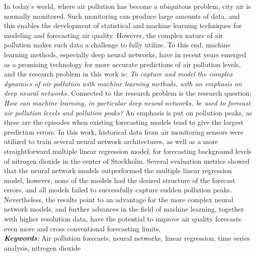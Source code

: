 In today's world, where air pollution has become a ubiquitous problem, city air is normally monitored. Such monitoring can produce large amounts of data, and this enables the development of statistical and machine learning techniques for modeling and forecasting air quality. However, the complex nature of air pollution makes such data a challenge to fully utilize. To this end, machine learning methods, especially deep neural networks, have in recent years emerged as a promising technology for more accurate predictions of air pollution levels, and the research problem in this work is; \textit{To capture and model the complex dynamics of air pollution with machine learning methods, with an emphasis on deep neural networks}. Connected to the research problem is the research question; \textit{How can machine learning, in particular deep neural networks, be used to forecast air pollution levels and pollution peaks?} An emphasis is put on pollution peaks, as these are the episodes when existing forecasting models tend to give the largest prediction errors. In this work, historical data from air monitoring sensors were utilized to train several neural network architectures, as well as a more straightforward multiple linear regression model, for forecasting background levels of nitrogen dioxide in the center of Stockholm. Several evaluation metrics showed that the neural network models outperformed the multiple linear regression model, however, none of the models had the desired structure of the forecast errors, and all models failed to successfully capture sudden pollution peaks. Nevertheless, the results point to an advantage for the more complex neural network models, and further advances in the field of machine learning, together with higher resolution data, have the potential to improve air quality forecasts even more and cross conventional forecasting limits.
\\ 

\noindent
\emph{\textbf{Keywords}:} Air pollution forecasts, neural networks, linear regression, time series analysis, nitrogen dioxide\\



